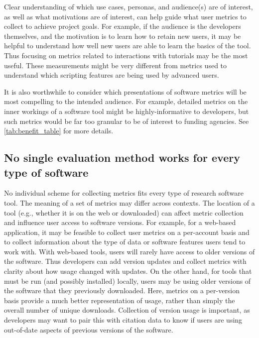 \documentclass{article}
\begin{document}
Clear understanding of which use cases, personas, and audience(s) are of interest, as well as what motivations are of interest, can help guide what user metrics to collect to achieve project goals.  For example, if the audience is the developers themselves, and the motivation is to learn how to retain new users, it may be helpful to understand how well new users are able to learn the basics of the tool. Thus focusing on metrics related to interactions with tutorials may be the most useful. These measurements might be very different from metrics used to understand which scripting features are being used by advanced users. 

It is also worthwhile to consider which presentations of software metrics will be most compelling to the intended audience. For example, detailed metrics on the inner workings of a software tool might be highly-informative to developers, but such metrics would be far too granular to be of interest to funding agencies.  See \ref{tab:benefit_table} for more details.
 


\subsection{No single evaluation method works for every type of software}
\label{sec:no_one_way}
No individual scheme for collecting metrics fits every type of research software tool.  The meaning of a set of metrics may differ across contexts. The location of a tool (e.g., whether it is on the web or downloaded) can affect metric collection and influence user access to software versions. For example, for a web-based application, it may be feasible to collect user metrics on a per-account basis and to collect information about the type of data or software features users tend to work with. With web-based tools, users will rarely have access to older versions of the software. Thus developers can add version updates and collect metrics with clarity about how usage changed with updates. On the other hand, for tools that must be run (and possibly installed)  locally, users may be using older versions of the software that they previously downloaded.  Here, metrics on a per-version basis provide a much better representation of usage, rather than simply the overall number of unique downloads. Collection of version usage is important, as developers may want to pair this with citation data to know if users are using out-of-date aspects of previous versions of the software.
\end{document}
